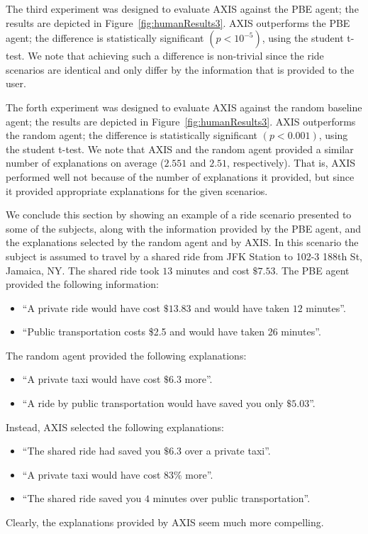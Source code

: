 \documentclass[letterpaper]{article} %
\begin{document}
The third experiment was designed to evaluate AXIS against the PBE  agent; the results are depicted in Figure~\ref{fig:humanResults3}. 
AXIS outperforms the PBE agent; the difference is statistically significant $(p<10^{-5})$, using the student t-test. 
We note that achieving such a difference is non-trivial since the ride scenarios are identical and only differ by the information that is provided to the user.

The forth experiment was designed to evaluate AXIS against the random baseline agent; the results are depicted in Figure~\ref{fig:humanResults3}. 
AXIS outperforms the random agent; the difference is statistically significant $(p<0.001)$, using the student t-test. 
We note that AXIS and the random agent provided a similar number of explanations on average ($2.551$ and $2.51$, respectively). That is, AXIS performed well not because of the number of explanations it provided, but since it provided appropriate explanations for the given scenarios. 
%

We conclude this section by showing an example of a ride scenario presented to some of the subjects, along with the information provided by the PBE agent, and the explanations selected by the random agent and by AXIS.
In this scenario the subject is assumed to travel by a shared ride from JFK Station to 102-3 188th St, Jamaica, NY.
The shared ride took $13$ minutes and cost $\$7.53$.
The PBE agent provided the following information:
\begin{itemize}
    \item ``A private ride would have cost $\$13.83$ and would have taken $12$ minutes''.
    \item ``Public transportation costs \$2.5 and would have taken 26 minutes''.
\end{itemize}
The random agent provided the following explanations:
\begin{itemize}
    \item ``A private taxi would have cost $\$6.3$ more''.
    \item ``A ride by public transportation would have saved you only $\$5.03$''.
\end{itemize}
Instead, AXIS selected the following explanations:
\begin{itemize}
    \item ``The shared ride had saved you $\$6.3$ over a private taxi''.
    \item ``A private taxi would have cost $83\%$ more''.
    \item ``The shared ride saved you $4$ minutes over public transportation''.
\end{itemize}
Clearly, the explanations provided by AXIS seem much more compelling.
\end{document}

